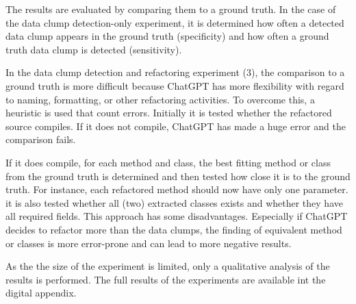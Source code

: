 The results are evaluated by comparing them to a ground truth. In the case of the data clump detection-only experiment, it is determined how often a detected data clump appears in the ground truth (specificity) and how often a ground truth data clump is detected (sensitivity).

In the data clump detection and refactoring experiment (3), the comparison to a ground truth is more difficult because ChatGPT has more flexibility with regard to naming, formatting, or other refactoring activities. To overcome this, a heuristic is used that count errors. Initially it is tested whether the refactored source compiles. If it does not compile, ChatGPT has made a huge error and the comparison fails.

If it does compile, for each method and class, the best fitting method or class from the ground truth is determined and then tested how close it is to the ground truth. For instance, each refactored method should now have only one parameter. it is also tested whether all (two) extracted classes exists and whether  they have all required fields. This approach has some disadvantages. Especially if ChatGPT decides to refactor more than the data clumps, the finding of equivalent method or classes is more error-prone and can lead to more negative results. 

As the the size of the experiment is limited, only a qualitative analysis of the results is performed. The full results of the experiments are available int the digital appendix. 

